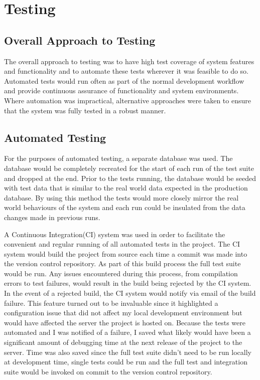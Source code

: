 \chapter{Testing}

\section{Overall Approach to Testing}

The overall approach to testing was to have high test coverage of system features and functionality and to automate these tests wherever it was feasible to do so. Automated tests would run often as part of the normal development workflow and provide continuous assurance of functionality and system environments. Where automation was impractical, alternative approaches were taken to ensure that the system was fully tested in a robust manner.

\section{Automated Testing}

For the purposes of automated testing, a separate database was used. The database would be completely recreated for the start of each run of the test suite and dropped at the end. Prior to the tests running, the database would be seeded with test data that is similar to the real world data expected in the production database. By using this method the tests would more closely mirror the real world behaviours of the system and each run could be insulated from the data changes made in previous runs.

A Continuous Integration(CI) system was used in order to facilitate the convenient and regular running of all automated tests in the project. The CI system would build the project from source each time a commit was made into the version control repository. As part of this build process the full test suite would be run. Any issues encountered during this process, from compilation errors to test failures, would result in the build being rejected by the CI system. In the event of a rejected build, the CI system would notify via email of the build failure. This feature turned out to be invaluable since it highlighted a configuration issue that did not affect my local development environment but would have affected the server the project is hosted on. Because the tests were automated and I was notified of a failure, I saved what likely would have been a significant amount of debugging time at the next release of the project to the server. Time was also saved since the full test suite didn't need to be run locally at development time, single tests could be run and the full test and integration suite would be invoked on commit to the version control repository. 


